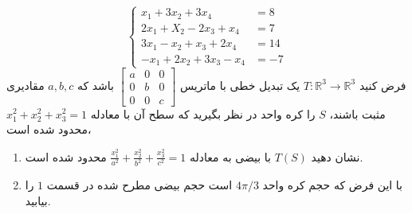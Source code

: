 \documentclass{article}
\begin{document}
\begin{equation*}
\left\{
\begin{array}{rl}
	x_1+3x_2+3x_4&=8\\
	2x_1+X_2-2x_3+x_4&=7\\
	3x_1-x_2+x_3+2x_4&=14\\
	-x_1+2x_2+3x_3-x_4&=-7
\end{array} \right.
\end{equation*}
فرض کنید 
$T:\mathbb{R}^3\longrightarrow \mathbb{R}^3$
یک تبدیل خطی با ماتریس 
$\begin{bmatrix}
a&0&0\\
0&b&0\\
0&0&c
\end{bmatrix}$
باشد که 
$a,b,c$
مقادیری مثبت باشند،
$S$
را کره واحد در نظر بگیرید که سطح آن با معادله 
$x_1^2+x_2^2+x_3^2=1$
محدود شده است،
\begin{enumerate}
	\item 
نشان دهید 
$T(S)$
با بیضی به معادله 
$\frac{x_1^2}{a^2}+\frac{x_2^2}{b^2}+\frac{x_3^2}{c^2}=1$
محدود شده است.
\item 
با این فرض که حجم کره واحد 
$4\pi/3$
است حجم بیضی مطرح شده در قسمت 
$1$
را بیابید.
\end{enumerate}
\end{document}
